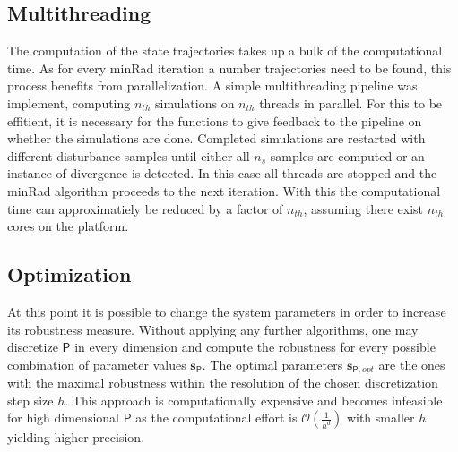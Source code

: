     


\subsection{Multithreading} \label{mt}
    
    The computation of the state trajectories takes up a bulk of the computational time. As for every minRad iteration a number trajectories need to be found, this process benefits from parallelization. A simple multithreading pipeline was implement, computing $n_{th}$ simulations on $n_{th}$ threads in parallel. For this to be effitient, it is necessary for the functions to give feedback to the pipeline on whether the simulations are done. Completed simulations are restarted with different disturbance samples until either all $n_s$ samples are computed or an instance of divergence is detected. In this case all threads are stopped and the minRad algorithm proceeds to the next iteration. 
    With this the computational time can approximatiely be reduced by a factor of $n_{th}$, assuming there exist $n_{th}$ cores on the platform. 

\subsection{Optimization} \label{opt}
    
    At this point it is possible to change the system parameters in order to increase its robustness measure.
    Without applying any further algorithms, one may discretize $\mathsf{P}$ in every dimension and compute the robustness for every possible combination of parameter values $\mathbf{s}_{\mathsf{P}}$. The optimal parameters $\mathbf{s}_{\mathsf{P},opt}$ are the ones with the maximal robustness within the resolution of the chosen discretization step size $h$. This approach is computationally expensive and becomes infeasible for high dimensional $\mathsf{P}$ as the computational effort is $\mathcal{O}(\frac{1}{h^d})$ with smaller $h$ yielding higher precision. 
    
